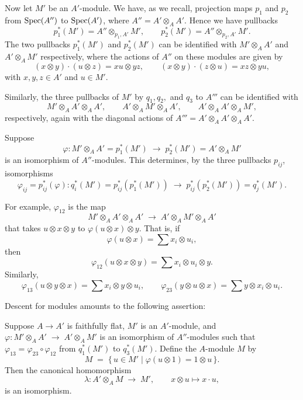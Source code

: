 \documentclass[12pt]{article}
\begin{document}
Now let $M'$ be an $A'$-module. We have, as we recall, projection maps 
$p_1$ and $p_2$ from $\operatorname{Spec}(A'')$ to $\operatorname{Spec}(A')$, where 
$A'' = A' \otimes_A A'$. Hence we have pullbacks
\[
p_1^*(M') = A'' \otimes_{p_1,A'} M', 
\qquad 
p_2^*(M') = A'' \otimes_{p_2,A'} M'.
\]
The two pullbacks $p_1^*(M')$ and $p_2^*(M')$ can be identified with 
$M' \otimes_A A'$ and $A' \otimes_A M'$ respectively, where the actions of 
$A''$ on these modules are given by
\[
(x \otimes y)\cdot(u \otimes z) = xu \otimes yz, 
\qquad 
(x \otimes y)\cdot(z \otimes u) = xz \otimes yu,
\]
with $x,y,z \in A'$ and $u \in M'$.  

Similarly, the three pullbacks of $M'$ by $q_1, q_2,$ and $q_3$ to $A'''$ can be identified with
\[
M' \otimes_A A' \otimes_A A', 
\qquad 
A' \otimes_A M' \otimes_A A', 
\qquad 
A' \otimes_A A' \otimes_A M',
\]
respectively, again with the diagonal actions of $A''' = A' \otimes_A A' \otimes_A A'$.  

Suppose 
\[
\varphi : M' \otimes_A A' = p_1^*(M') \;\longrightarrow\; p_2^*(M') = A' \otimes_A M'
\]
is an isomorphism of $A''$-modules. This determines, by the three pullbacks $p_{ij}$, isomorphisms
\[
\varphi_{ij} = p_{ij}^*(\varphi) : 
q_i^*(M') = p_{ij}^*(p_1^*(M')) 
\;\longrightarrow\; 
p_{ij}^*(p_2^*(M')) = q_j^*(M').
\]

For example, $\varphi_{12}$ is the map
\[
M' \otimes_A A' \otimes_A A' \;\longrightarrow\; A' \otimes_A M' \otimes_A A'
\]
that takes $u \otimes x \otimes y$ to $\varphi(u \otimes x) \otimes y$. That is, if
\[
\varphi(u \otimes x) = \sum x_i \otimes u_i,
\]
then
\[
\varphi_{12}(u \otimes x \otimes y) = \sum x_i \otimes u_i \otimes y.
\]
Similarly,
\[
\varphi_{13}(u \otimes y \otimes x) = \sum x_i \otimes y \otimes u_i,
\qquad
\varphi_{23}(y \otimes u \otimes x) = \sum y \otimes x_i \otimes u_i.
\]

Descent for modules amounts to the following assertion:

\begin{lemma}\label{lem:descent_modules}
Suppose $A \to A'$ is faithfully flat, $M'$ is an $A'$-module, and 
$\varphi : M' \otimes_A A' \;\to\; A' \otimes_A M'$
is an isomorphism of $A''$-modules such that 
$\varphi_{13} = \varphi_{23} \circ \varphi_{12}$ 
from $q_1^*(M')$ to $q_3^*(M')$.  
Define the $A$-module $M$ by
\[
M \;=\; \{\, u \in M' \mid \varphi(u \otimes 1) = 1 \otimes u \,\}.
\]
Then the canonical homomorphism 
\[
\lambda : A' \otimes_A M \;\longrightarrow\; M', 
\qquad x \otimes u \longmapsto x \cdot u,
\]
is an isomorphism.
\end{lemma}
\end{document}
